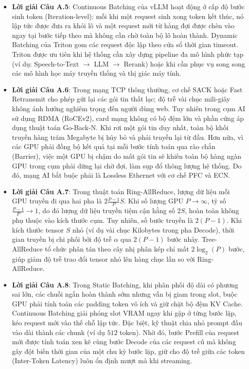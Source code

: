 \begin{itemize}
  \item \textbf{Lời giải Câu A.5}:
  Continuous Batching của vLLM hoạt động ở cấp độ bước sinh token (Iteration-level): mỗi khi một request sinh xong token kết thúc, nó lập tức được đưa ra khỏi lô và một request mới từ hàng đợi được chèn vào ngay tại bước tiếp theo mà không cần chờ toàn bộ lô hoàn thành. Dynamic Batching của Triton gom các request độc lập theo cửa sổ thời gian timeout. Triton được ưu tiên khi hệ thống cần xây dựng pipeline đa mô hình phức tạp (ví dụ: Speech-to-Text $\to$ LLM $\to$ Rerank) hoặc khi cần phục vụ song song các mô hình học máy truyền thống và thị giác máy tính.

  \item \textbf{Lời giải Câu A.6}:
  Trong mạng TCP thông thường, cơ chế SACK hoặc Fast Retransmit cho phép gửi lại các gói tin thất lạc; độ trễ vài chục mili-giây không ảnh hưởng nghiêm trọng đến người dùng web. Tuy nhiên trong cụm AI sử dụng RDMA (RoCEv2), card mạng không có bộ đệm lớn và phần cứng áp dụng thuật toán Go-Back-N. Khi rơi một gói tin duy nhất, toàn bộ khối truyền hàng trăm Megabyte bị hủy bỏ và phải truyền lại từ đầu. Hơn nữa, vì các GPU phải đồng bộ kết quả tại mỗi bước tính toán qua rào chắn (Barrier), việc một GPU bị chậm do mất gói tin sẽ khiến toàn bộ hàng ngàn GPU trong cụm phải dừng lại chờ đợi, làm sụp đổ thông lượng hệ thống. Do đó, mạng AI bắt buộc phải là Lossless Ethernet với cơ chế PFC và ECN.

  \item \textbf{Lời giải Câu A.7}:
  Trong thuật toán Ring-AllReduce, lượng dữ liệu mỗi GPU truyền đi qua hai pha là $2 \frac{P-1}{P} S$. Khi số lượng GPU $P \to \infty$, tỷ số $\frac{P-1}{P} \to 1$, do đó lượng dữ liệu truyền tiệm cận hằng số $2S$, hoàn toàn không phụ thuộc vào kích thước cụm.
  Tuy nhiên, số bước truyền là $2(P-1)$. Khi kích thước tensor $S$ nhỏ (ví dụ vài chục Kilobytes trong pha Decode), thời gian truyền bị chi phối bởi độ trễ $\alpha$ qua $2(P-1)$ bước nhảy. Tree-AllReduce tổ chức phân tán theo cây nhị phân kép chỉ mất $2\log_2(P)$ bước, giúp giảm độ trễ trao đổi tensor nhỏ lên hàng chục lần so với Ring-AllReduce.

  \item \textbf{Lời giải Câu A.8}:
  Trong Static Batching, khi phân phối độ dài có phương sai lớn, các chuỗi ngắn hoàn thành sớm nhưng vẫn bị giam trong slot, buộc GPU phải tính toán các padding token vô ích và giữ chặt bộ đệm KV Cache. Continuous Batching giải phóng slot VRAM ngay khi gặp  ở từng bước lặp, kéo request mới vào thế chỗ lập tức.
  Đặc biệt, kỹ thuật  chia nhỏ prompt đầu vào dài thành các chunk (ví dụ $512$ token). Nhờ đó, bước Prefill của request mới được tính toán xen kẽ cùng bước Decode của các request cũ mà không gây đột biến thời gian của một chu kỳ bước lặp, giữ cho độ trễ giữa các token (Inter-Token Latency) luôn ổn định mượt mà khi streaming.


\end{itemize}
